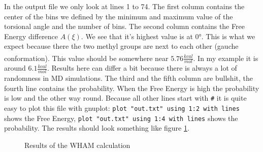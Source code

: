 \documentclass[a4paper,11pt]{scrartcl}
\newcommand{\myCite}[1]{\textsuperscript{\cite{#1}}}
\begin{document}
In the output file we only look at lines 1 to 74. The first column contains the center of the bins we defined by the minimum and maximum value of the torsional angle and the number of bins. The second column contains the Free Energy difference $A(\xi)$. We see that it's highest value is at 0°. This is what we expect because there the two methyl groups are next to each other (gauche conformation). This value should be somewhere near $5.76 \frac{kcal}{mol}$\myCite{becker_development_2015}. In my example it is around $6.1 \frac{kcal}{mol}$. Results here can differ a bit because there is always a lot of randomness in MD simulations. The third and the fifth column are bullshit, the fourth line contains the probability. When the Free Energy is high the probability is low and the other way round. Because all other lines start with \texttt{\#} it is quite easy to plot this file with gnuplot: \texttt{plot "out.txt" using 1:2 with lines} shows the Free Energy, \texttt{plot "out.txt" using 1:4 with lines} shows the probability. The results should look something like figure \ref{fig:wham_result}.

\begin{figure} [htb]
	\caption{Results of the WHAM calculation}
	\label{fig:wham_result}
\end{figure} 



\FloatBarrier
\newpage

\printacronyms[include-classes=abbrev,name=Abbreviations]

\newpage
\end{document}
